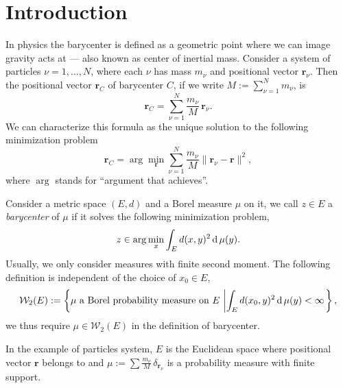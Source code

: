 \chapter*{Introduction}
In physics the barycenter is defined
as a geometric point where we can image gravity acts at ---
also known as center of inertial mass.
Consider a system of particles  $\nu = 1, \ldots , N$,
where each $\nu$ has mass $m_\nu$ and positional vector $\boldsymbol{r}_\nu$.
Then the positional vector $\boldsymbol{r}_C$ of barycenter $C$,
if we write \( M := \sum _ { \nu = 1 } ^ { N } m _ { \nu }\), is
\[
	\boldsymbol { r }_ { C } =
	\sum_ { \nu = 1 } ^ { N } \frac{m_ { \nu } }{M}\,\boldsymbol { r }_ { \nu }.
\]
We can characterize this formula as the unique solution to the following minimization problem
\begin{equation}
	\label{barycenter_def}
	\boldsymbol{r}_C = \arg \min_{\boldsymbol{r}} \sum_{\nu= 1}^N \frac{m_\nu}{M}
	\|\boldsymbol{r}_{\nu} - \boldsymbol{r}\|^2,
\end{equation}
where $\arg$ stands for ``argument that achieves''.

\begin{defn}
	Consider a metric space $(E,d)$ and a Borel measure $\mu$ on it,
	we call $z \in E$ a \emph{barycenter} of $\mu$ if it solves the following minimization problem,
	\[
		z \in \arg\min_{x}\int_{E} d(x, y)^2 \operatorname{d} \mu (y).
	\]
	Usually, we only consider measures with finite second moment.
	The following definition is independent of the choice of $x_0 \in E$,
	\[
					\mathcal{W}_2(E): = \left\{ \mu \text{ a Borel probability measure on } E \, \left|
				\int_{E} d(x_0, y)^2 \operatorname{d} \mu (y) < \infty \right. \right\},
	\]
	we thus require  $\mu \in \mathcal{W}_2(E)$ in the definition of barycenter.
\end{defn}

\begin{rmk}
	In the example of particles system,
	$E$ is the Euclidean space where positional vector $\boldsymbol{r}$ belongs to
	and $\mu := \sum \frac{m_\nu}{M} \, \delta_{\boldsymbol{r}_\nu}$ is a probability measure with finite support.
\end{rmk}


